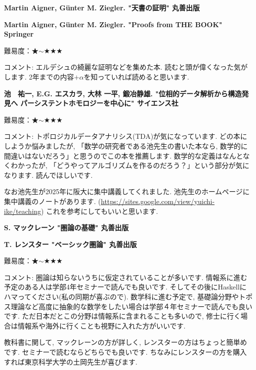 \textbf{Martin Aigner, G\"unter M. Ziegler. "天書の証明" 丸善出版}  　\vspace{-6pt} 

\textbf{Martin Aigner, G\"unter M. Ziegler. "Proofs from THE BOOK" Springer}  　\vspace{-6pt} 

難易度：★$\sim$★★★ 　\vspace{-6pt} 

コメント: エルデシュの綺麗な証明などを集めた本. 読むと頭が偉くなった気がします. 
2年までの内容$+\alpha$を知っていれば読めると思います.  
\vspace{8pt}

\textbf{池　祐一, E.G. エスカラ, 大林 一平, 鍛冶静雄. "位相的データ解析から構造発見へ パーシステントホモロジーを中心に" サイエンス社}  　\vspace{-6pt} 

難易度：★$\sim$★★★\vspace{-6pt} 

コメント: トポロジカルデータアナリシス(TDA)が気になっています. どの本にしようか悩みましたが, 「数学の研究者である池先生の書いた本なら, 数学的に間違いはないだろう」と思うのでこの本を推薦します. 数学的な定義はなんとなくわかったが, 「どうやってアルゴリズムを作るのだろう？」という部分が気になります. 読んでほしいです. 

なお池先生が2025年に阪大に集中講義してくれました. 池先生のホームページに集中講義のノートがあります. (\url{https://sites.google.com/view/yuichi-ike/teaching}) これを参考にしてもいいと思います. 
\vspace{8pt}

\textbf{S. マックレーン "圏論の基礎" 丸善出版}  　\vspace{-6pt} 

\textbf{T. レンスター "ベーシック圏論" 丸善出版}  　\vspace{-6pt} 

難易度：★$\sim$★★★ \vspace{-6pt} 

コメント: 圏論は知らないうちに仮定されていることが多いです. 情報系に進む予定のある人は学部4年セミナーで読んでも良いです.  そしてその後にHaskellにハマってください(私の同期が喜ぶので). 数学科に進む予定で, 基礎論分野やトポス理論など高度に抽象的な数学をしたい場合は学部４年セミナーで読んでも良いです. ただ日本だとこの分野は情報系に含まれることも多いので, 修士に行く場合は情報系や海外に行くことも視野に入れた方がいいです. 

教科書に関して, マックレーンの方が詳しく, レンスターの方はちょっと簡単めです. セミナーで読むならどちらでも良いです. ちなみにレンスターの方を購入すれば東京科学大学の土岡先生が喜びます. 
\vspace{8pt}

